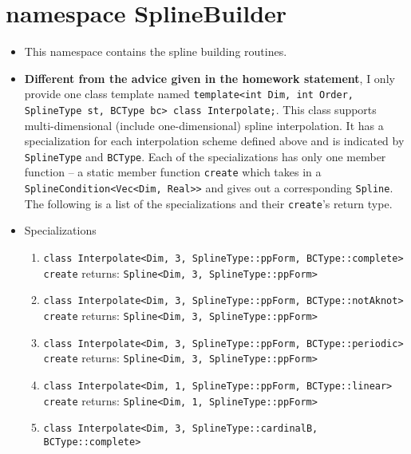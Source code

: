 \documentclass[12pt]{article}
\begin{document}
\section{namespace SplineBuilder}

    \begin{itemize}
        \item This namespace contains the spline building routines.
        \item \textbf{Different from the advice given in the homework statement}, I only provide one class template
              named \texttt{template<int Dim, int Order, SplineType st, BCType bc> class Interpolate;}. This class
              supports multi-dimensional (include one-dimensional) spline interpolation. It has a specialization 
              for each interpolation scheme defined above and is indicated by \texttt{SplineType} and \texttt{BCType}. 
              Each of the specializations has only one member function -- a static member function \texttt{create} which takes in a 
              \texttt{SplineCondition<Vec<Dim, Real>>} and gives out a corresponding \texttt{Spline}. \\
              The following is a list of the specializations and their \texttt{create}'s return type.
        \item Specializations
              \begin{enumerate}
                  \item \texttt{class Interpolate<Dim, 3, SplineType::ppForm, BCType::complete>}\\
                        \texttt{create} returns: \texttt{Spline<Dim, 3, SplineType::ppForm>}
                  \item \texttt{class Interpolate<Dim, 3, SplineType::ppForm, BCType::notAknot>}\\
                        \texttt{create} returns: \texttt{Spline<Dim, 3, SplineType::ppForm>}
                  \item \texttt{class Interpolate<Dim, 3, SplineType::ppForm, BCType::periodic>}\\
                        \texttt{create} returns: \texttt{Spline<Dim, 3, SplineType::ppForm>}
                  \item \texttt{class Interpolate<Dim, 1, SplineType::ppForm, BCType::linear>}\\
                        \texttt{create} returns: \texttt{Spline<Dim, 1, SplineType::ppForm>}
                  \item \texttt{class Interpolate<Dim, 3, SplineType::cardinalB, BCType::complete>}\\

\end{enumerate}
\end{itemize}
\end{document}
